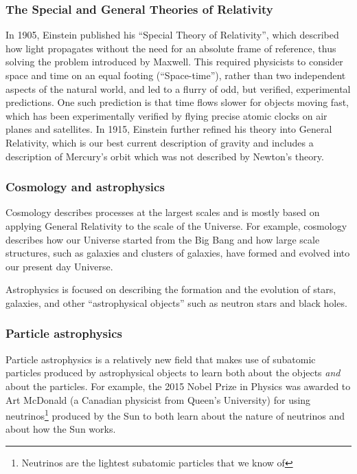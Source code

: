 \subsubsection{The Special and General Theories of Relativity}
In 1905, Einstein published his ``Special Theory of Relativity'', which described how light propagates without the need for an absolute frame of reference, thus solving the problem introduced by Maxwell. This required physicists to consider space and time on an equal footing (``Space-time''), rather than two independent aspects of the natural world, and led to a flurry of odd, but verified, experimental predictions. One such prediction is that time flows slower for objects moving fast, which has been experimentally verified by flying precise atomic clocks on air planes and satellites. In 1915, Einstein further refined his theory into General Relativity, which is our best current description of gravity and includes a description of Mercury's orbit which was not described by Newton's theory.

\subsubsection{Cosmology and astrophysics} 
Cosmology describes processes at the largest scales and is mostly based on applying General Relativity to the scale of the Universe. For example, cosmology describes how our Universe started from the Big Bang and how large scale structures, such as galaxies and clusters of galaxies, have formed and evolved into our present day Universe. 

Astrophysics is focused on describing the formation and the evolution of stars, galaxies, and other ``astrophysical objects'' such as neutron stars and black holes. 

\subsubsection{Particle astrophysics}
Particle astrophysics is a relatively new field that makes use of subatomic particles produced by astrophysical objects to learn both about the objects \textit{and} about the particles. For example, the 2015 Nobel Prize in Physics was awarded to Art McDonald (a Canadian physicist from Queen's University) for using neutrinos\footnote{Neutrinos are the lightest subatomic particles that we know of} produced by the Sun to both learn about the nature of neutrinos and about how the Sun works. 

